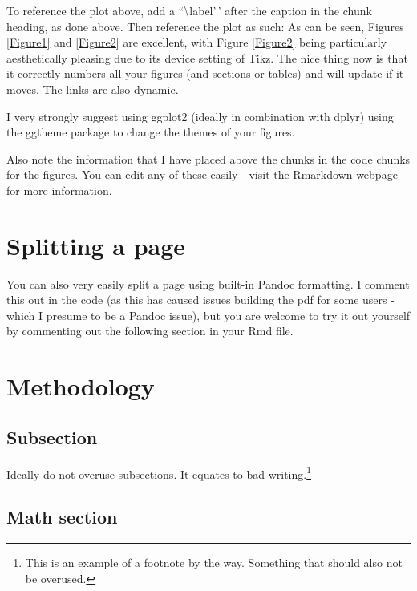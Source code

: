 \documentclass[11pt,preprint, authoryear]{elsarticle}
\numberwithin{equation}{section}
\numberwithin{figure}{section}
\numberwithin{table}{section}
\let\rmarkdownfootnote\footnote%
\def\footnote{\protect\rmarkdownfootnote}
\begin{document}
To reference the plot above, add a ``\textbackslash label'\,' after the
caption in the chunk heading, as done above. Then reference the plot as
such: As can be seen, Figures \ref{Figure1} and \ref{Figure2} are
excellent, with Figure \ref{Figure2} being particularly aesthetically
pleasing due to its device setting of Tikz. The nice thing now is that
it correctly numbers all your figures (and sections or tables) and will
update if it moves. The links are also dynamic.

I very strongly suggest using ggplot2 (ideally in combination with
dplyr) using the ggtheme package to change the themes of your figures.

Also note the information that I have placed above the chunks in the
code chunks for the figures. You can edit any of these easily - visit
the Rmarkdown webpage for more information.

\hypertarget{splitting-a-page}{%
\section{Splitting a page}\label{splitting-a-page}}

You can also very easily split a page using built-in Pandoc formatting.
I comment this out in the code (as this has caused issues building the
pdf for some users - which I presume to be a Pandoc issue), but you are
welcome to try it out yourself by commenting out the following section
in your Rmd file.

\hypertarget{methodology}{%
\section{\texorpdfstring{Methodology
\label{Meth}}{Methodology }}\label{methodology}}

\hypertarget{subsection}{%
\subsection{Subsection}\label{subsection}}

Ideally do not overuse subsections. It equates to bad
writing.\footnote{This is an example of a footnote by the way. Something
  that should also not be overused.}

\hypertarget{math-section}{%
\subsection{Math section}\label{math-section}}
\end{document}

